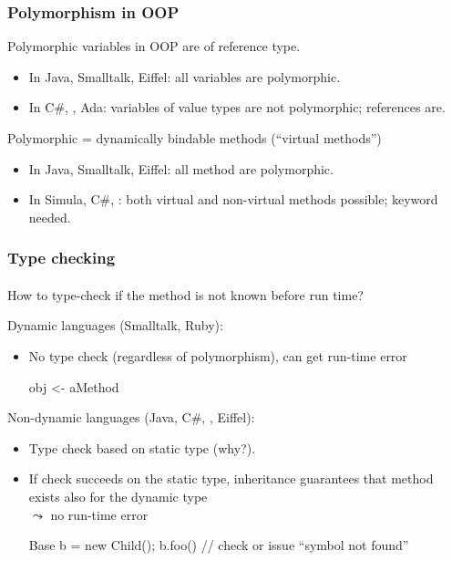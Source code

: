 \begin{frame}
\frametitle{Polymorphism in OOP}
Polymorphic variables in OOP are of reference type.
\begin{itemize}
\item In Java, Smalltalk, Eiffel: all variables are polymorphic.
\item In C\#, \Cpp, Ada: variables of value types are not polymorphic;
references are. 
\end{itemize}
\bigskip

Polymorphic = dynamically bindable methods (``virtual methods'') 
 
\begin{itemize}
\item In Java, Smalltalk, Eiffel: all method are polymorphic.
\item In Simula, C\#, \Cpp:  both virtual and non-virtual methods possible;
 keyword needed. 
\end{itemize}
\end{frame}

\begin{frame}[fragile]
\frametitle{Type checking }
\framesubtitle{}
How to type-check if the method is not known before run time? 
\bigskip

Dynamic languages (Smalltalk, Ruby): 
\begin{itemize}
\item No type check (regardless of polymorphism), can get run-time error
\begin{cplus3}
       obj <- aMethod
\end{cplus3}
\end{itemize}

Non-dynamic languages (Java, C\#, \Cpp, Eiffel):

\begin{itemize}
\item Type check based on static type (why?).
\item If check succeeds on the static type, 
inheritance guarantees that method exists also for the dynamic
type 
\\
$\leadsto$ no run-time error

\begin{cplus3}
Base b = new Child();
b.foo()                // check or issue ``symbol not found''
\end{cplus3}
\end{itemize}

\end{frame}


